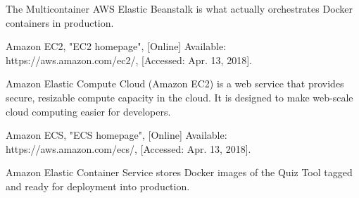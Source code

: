 \documentclass[11pt,a4paper]{report}
\begin{document}
\begin{thebibliography}{1}
    The Multicontainer AWS Elastic Beanstalk is what actually orchestrates Docker containers in production.

 Amazon EC2, "EC2 homepage", [Online] Available: https://aws.amazon.com/ec2/, [Accessed: Apr. 13, 2018].

    Amazon Elastic Compute Cloud (Amazon EC2) is a web service that provides secure, resizable compute capacity in the cloud. It is designed to make web-scale cloud computing easier for developers.

 Amazon ECS, "ECS homepage", [Online] Available: https://aws.amazon.com/ecs/, [Accessed: Apr. 13, 2018].

    Amazon Elastic Container Service stores Docker images of the Quiz Tool tagged and ready for deployment into production.

\end{thebibliography}
\end{document}
